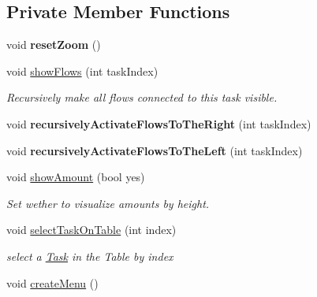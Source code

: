 \subsection*{Private Member Functions}
\begin{DoxyCompactItemize}
\item 
\hypertarget{class_main_window_a6a403614bd858e16e35af405c562fc9b}{}void {\bfseries reset\+Zoom} ()\label{class_main_window_a6a403614bd858e16e35af405c562fc9b}

\item 
\hypertarget{class_main_window_aa9bca4a0b90acf75f82a7f1acc411acb}{}void \hyperlink{class_main_window_aa9bca4a0b90acf75f82a7f1acc411acb}{show\+Flows} (int task\+Index)\label{class_main_window_aa9bca4a0b90acf75f82a7f1acc411acb}

\begin{DoxyCompactList}\small\item\em Recursively make all flows connected to this task visible. \end{DoxyCompactList}\item 
\hypertarget{class_main_window_a8c5ff24ebba239b7dbf435b3dd50e1f3}{}void {\bfseries recursively\+Activate\+Flows\+To\+The\+Right} (int task\+Index)\label{class_main_window_a8c5ff24ebba239b7dbf435b3dd50e1f3}

\item 
\hypertarget{class_main_window_af938550e53f022625dd21ff1536bb36b}{}void {\bfseries recursively\+Activate\+Flows\+To\+The\+Left} (int task\+Index)\label{class_main_window_af938550e53f022625dd21ff1536bb36b}

\item 
\hypertarget{class_main_window_a63772da55576703fd979ced117a9fa89}{}void \hyperlink{class_main_window_a63772da55576703fd979ced117a9fa89}{show\+Amount} (bool yes)\label{class_main_window_a63772da55576703fd979ced117a9fa89}

\begin{DoxyCompactList}\small\item\em Set wether to visualize amounts by height. \end{DoxyCompactList}\item 
\hypertarget{class_main_window_a28e45b950a89e35ffb5b1d1e345e7aa6}{}void \hyperlink{class_main_window_a28e45b950a89e35ffb5b1d1e345e7aa6}{select\+Task\+On\+Table} (int index)\label{class_main_window_a28e45b950a89e35ffb5b1d1e345e7aa6}

\begin{DoxyCompactList}\small\item\em select a \hyperlink{struct_task}{Task} in the Table by index \end{DoxyCompactList}\item 
\hypertarget{class_main_window_a03799692902ab88a551b4dca1fa042db}{}void \hyperlink{class_main_window_a03799692902ab88a551b4dca1fa042db}{create\+Menu} ()\label{class_main_window_a03799692902ab88a551b4dca1fa042db}


\end{DoxyCompactItemize}

